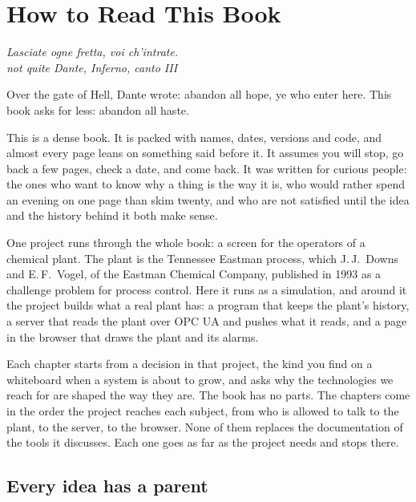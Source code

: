 \chapter*{How to Read This Book}

\begin{flushright}
\itshape Lasciate ogne fretta, voi ch'intrate.\\[2pt]
\upshape\small not quite Dante, \emph{Inferno}, canto III
\end{flushright}

Over the gate of Hell, Dante wrote: abandon all hope, ye who enter here. This
book asks for less: abandon all haste.

This is a dense book. It is packed with names, dates, versions and code, and
almost every page leans on something said before it. It assumes you will stop,
go back a few pages, check a date, and come back. It was written for curious
people: the ones who want to know why a thing is the way it is, who would rather
spend an evening on one page than skim twenty, and who are not satisfied until
the idea and the history behind it both make sense.

One project runs through the whole book: a screen for the operators of a
chemical plant. The plant is the Tennessee Eastman process, which J.\,J.~Downs
and E.\,F.~Vogel, of the Eastman Chemical Company, published in 1993 as a
challenge problem for process control. Here it runs as a simulation, and around
it the project builds what a real plant has: a program that keeps the plant's
history, a server that reads the plant over OPC UA and pushes what it reads,
and a page in the browser that draws the plant and its alarms.

Each chapter starts from a decision in that project, the kind you find on a
whiteboard when a system is about to grow, and asks why the technologies we
reach for are shaped the way they are. The book has no parts. The chapters come
in the order the project reaches each subject, from who is allowed to talk to
the plant, to the server, to the browser. None of them replaces the
documentation of the tools it discusses. Each one goes as far as the project
needs and stops there.

\section*{Every idea has a parent}

